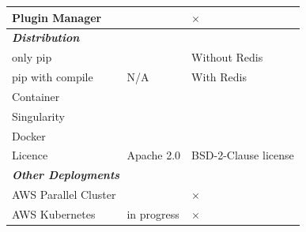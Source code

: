 \documentclass[sigconf]{acmart}
\newcommand{\YES}{\ding{51}}
\newcommand{\NO}{$\times$}
\begin{document}
\begin{table}[htbp]
{\begin{tabular}{|l|l|l|}
\hline
Plugin Manager & \YES & \NO \\
\hline
\multicolumn{3}{|l|}{\bf\em Distribution}\\
\hline
only pip & \YES & Without Redis \\
pip with compile & N/A & With Redis \\
Container & \YES & \YES \\
Singularity & \YES & \YES \\
Docker & \YES & \YES \\
Licence  & Apache 2.0 & BSD-2-Clause license \\
\hline
\multicolumn{3}{|l|}{\bf\em Other Deployments}\\
\hline
AWS Parallel Cluster & \YES & \NO \\ 
AWS Kubernetes  & in progress & \NO \\
\hline
\end{tabular}
}
\end{table}

\end{document}

